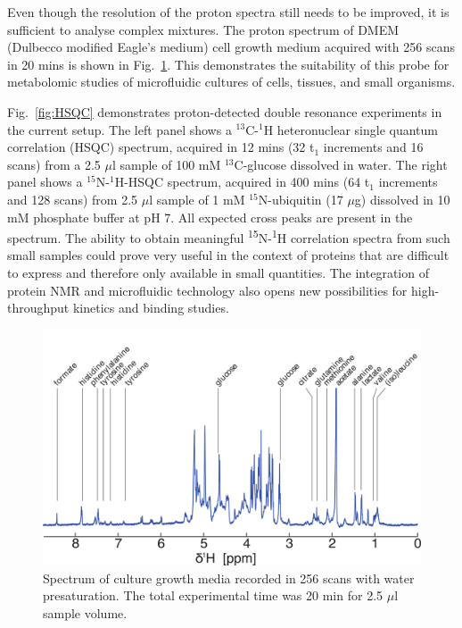 \documentclass[preprint,5p]{elsarticle}
\newcommand{\fig}[1]{Fig.~\ref{#1}}
\begin{document}
Even though the resolution of the proton spectra still needs to be improved, it is sufficient to analyse
complex mixtures. The proton spectrum of DMEM (Dulbecco modified Eagle's medium) cell growth medium acquired with 256 
scans in 20 mins is shown in \fig{fig:media-spec}. This demonstrates the suitability of this probe 
for metabolomic studies of microfluidic cultures of cells, tissues, and small organisms. 

\fig{fig:HSQC} demonstrates proton-detected double resonance experiments in the current setup. 
The left panel shows a $^{13}$C-$^{1}$H heteronuclear single quantum correlation (HSQC) spectrum, acquired in 12 mins 
(32 t$_1$ increments and 16 scans) 
from a 2.5 $\mu$l sample of 100 mM $^{13}$C-glucose dissolved in water. The right panel shows a 
$^{15}$N-$^{1}$H-HSQC spectrum, acquired in 400 mins (64 t$_1$ increments and 128 scans) 
from 2.5 $\mu$l sample of 1 mM $^{15}$N-ubiquitin (17 $\mu$g) dissolved in 10 mM phosphate buffer at pH 7. 
All expected cross peaks are present in the spectrum. The ability to obtain meaningful  \textsuperscript{15}N-\textsuperscript{1}H correlation spectra from such small samples could prove very useful in the context of
proteins that are difficult to express and therefore only available in small quantities. The integration of
protein NMR and microfluidic technology also opens new possibilities for high-throughput kinetics and 
binding studies. 

\begin{figure}
\centering
\includegraphics[width=.7\linewidth,keepaspectratio=true]{./figures/media-180125-005-bigger-font.png} 
\caption{Spectrum of culture growth media recorded in 256 scans with water presaturation. The total experimental time was 20 min for 2.5 $\mu$l sample volume.}
\label{fig:media-spec} 
\end{figure}
\end{document}
